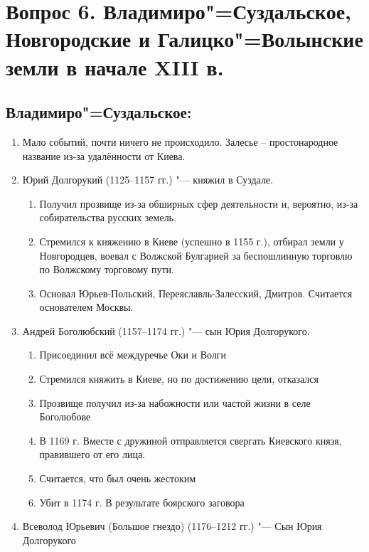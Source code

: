 \section{Вопрос 6. Владимиро"=Суздальское, Новгородские и Галицко"=Волынские земли в начале XIII в.}

\subsection{Владимиро"=Суздальское:}

\begin{enumerate}
    \item{ Мало событий, почти ничего не происходило. Залесье – простонародное название из-за удалённости от Киева.}
    \item{ Юрий Долгорукий (1125--1157 гг.) "--- княжил в Суздале.

        \begin{enumerate}
            \item{ Получил прозвище из-за обширных сфер деятельности и, вероятно, из-за собирательства русских земель.}
            \item{ Стремился к княжению в Киеве (успешно в 1155 г.), отбирал земли у Новгородцев, воевал с Волжской Булгарией за беспошлинную торговлю по Волжскому торговому пути.}
            \item{ Основал Юрьев-Польский, Переяславль-Залесский, Дмитров. Считается основателем Москвы.}
        \end{enumerate}
    }
    \item{ Андрей Боголюбский (1157--1174 гг.) "--- сын Юрия Долгорукого.

        \begin{enumerate}
            \item{ Присоединил всё междуречье Оки и Волги}
            \item{ Стремился княжить в Киеве, но по достижению цели, отказался}
            \item{ Прозвище получил из-за набожности или частой жизни в селе Боголюбове}
            \item{ В 1169 г. Вместе с дружиной отправляется свергать Киевского князя, правившего от его лица.}
            \item{ Считается, что был очень жестоким}
            \item{ Убит в 1174 г. В результате боярского заговора}
        \end{enumerate}
    }
    \item{ Всеволод Юрьевич (Большое гнездо) (1176--1212 гг.) "--- Сын Юрия Долгорукого

}
\end{enumerate}
